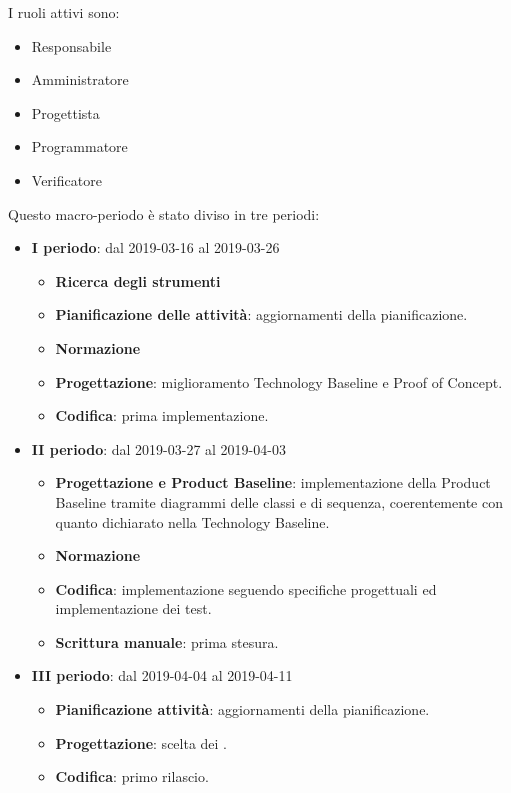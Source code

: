         I ruoli attivi sono:
        \begin{itemize}
            \item Responsabile
            \item Amministratore
            \item Progettista
            \item Programmatore
            \item Verificatore
        \end{itemize}
        Questo macro-periodo è stato diviso in tre periodi:
		\begin{itemize}
			\item \textbf{I periodo}: dal 2019-03-16 al 2019-03-26
			\begin{itemize}
    	        \item \textbf{Ricerca degli strumenti}
    	        \item \textbf{Pianificazione delle attività}: aggiornamenti della pianificazione.
    	        \item \textbf{Normazione}
    	        \item \textbf{Progettazione}: miglioramento Technology Baseline e Proof of Concept.
    	        \item \textbf{Codifica}: prima implementazione.
        	\end{itemize}
			\item \textbf{II periodo}: dal 2019-03-27 al 2019-04-03
			\begin{itemize}
				\item \textbf{Progettazione e Product Baseline}: implementazione della Product Baseline tramite diagrammi delle classi e di sequenza,
				coerentemente con quanto dichiarato nella Technology Baseline.
    	        \item \textbf{Normazione}
    	        \item \textbf{Codifica}: implementazione seguendo specifiche progettuali ed implementazione dei test.
    	        \item \textbf{Scrittura manuale}: prima stesura.
        	\end{itemize}
        	\item \textbf{III periodo}: dal 2019-04-04 al 2019-04-11
			\begin{itemize}
				\item \textbf{Pianificazione attività}: aggiornamenti della pianificazione.
    	        \item \textbf{Progettazione}: scelta dei .
    	        \item \textbf{Codifica}: primo rilascio.

\end{itemize}
\end{itemize}

